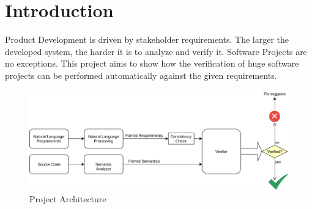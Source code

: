 \section{Introduction}
	Product Development is driven by stakeholder requirements. The larger the developed system, the harder it is to analyze and verify it. Software Projects are no exceptions. This project aims to show how the verification of huge software projects can be performed automatically against the given requirements.
	
	\begin{figure}[H]
		\centering
		\includegraphics[width=1\linewidth]{../Architecture}
		\caption[PorjArch]{Project Architecture}
		\label{fig:architecture}
	\end{figure}
	
